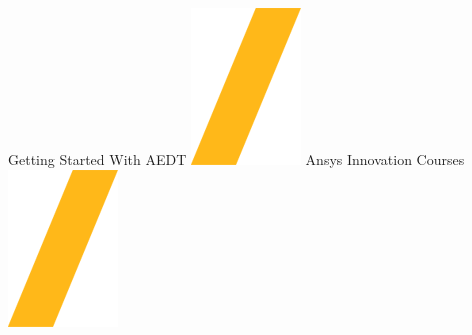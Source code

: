 \documentclass[landscape]{article}
\begin{document}
\noindent\makebox[\linewidth]{\rule{\paperwidth}{4pt}}
\begin{center}
Getting Started With AEDT \includegraphics[height=\fontcharht\font`\S]{slash.png} Ansys Innovation Courses \includegraphics[height=\fontcharht\font`\S]{slash.png} %
\end{center}
\end{document}
